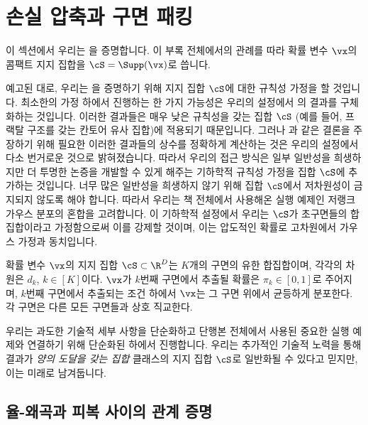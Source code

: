 \documentclass[../../book-main_ko.tex]{subfiles}
\begin{document}
\section{손실 압축과 구면 패킹}\label{app:rate-distortion-covering}

이 섹션에서 우리는 을 증명합니다.
이 부록 전체에서의 관례를 따라 확률 변수 \(\vx\)의 콤팩트 지지 집합을 \(\cS = \Supp(\vx)\)로 씁니다.

예고된 대로, 우리는 을 증명하기 위해 지지 집합 \(\cS\)에 대한 규칙성 가정을 할 것입니다. 최소한의 가정 하에서 진행하는 한 가지 가능성은 우리의 설정에서 \cite{Riegler2018-jh,Riegler2023-rr}의 결과를 구체화하는 것입니다. 이러한 결과들은 매우 낮은 규칙성을 갖는 집합 \(\cS\) (예를 들어, 프랙탈 구조를 갖는 칸토어 유사 집합)에 적용되기 때문입니다. 그러나 과 같은 결론을 주장하기 위해 필요한 이러한 결과들의 상수를 정확하게 계산하는 것은 우리의 설정에서 다소 번거로운 것으로 밝혀졌습니다.
따라서 우리의 접근 방식은 일부 일반성을 희생하지만 더 투명한 논증을 개발할 수 있게 해주는 기하학적 규칙성 가정을 집합 \(\cS\)에 추가하는 것입니다. 너무 많은 일반성을 희생하지 않기 위해 집합 \(\cS\)에서 저차원성이 금지되지 않도록 해야 합니다.
따라서 우리는 책 전체에서 사용해온 실행 예제인 저랭크 가우스 분포의 혼합을 고려합니다. 이 기하학적 설정에서 우리는 \(\cS\)가 초구면들의 합집합이라고 가정함으로써 이를 강제할 것이며, 이는 압도적인 확률로 고차원에서 가우스 가정과 동치입니다.

\begin{assumption}\label{assumption:union-of-spheres}
    확률 변수 \(\vx\)의 지지 집합 \(\cS \subset \R^D\)는 \(K\)개의 구면의 유한 합집합이며, 각각의 차원은 \(d_k\), \(k \in [K]\)이다.
    \(\vx\)가 \(k\)번째 구면에서 추출될 확률은 \(\pi_k \in [0, 1]\)로 주어지며, \(k\)번째 구면에서 추출되는 조건 하에서 \(\vx\)는 그 구면 위에서 균등하게 분포한다.
    각 구면은 다른 모든 구면들과 상호 직교한다.
\end{assumption}

우리는 과도한 기술적 세부 사항을 단순화하고 단행본 전체에서 사용된 중요한 실행 예제와 연결하기 위해 단순화된  하에서 진행합니다. 우리는 추가적인 기술적 노력을 통해 결과가 \textit{양의 도달을 갖는 집합} 클래스의 지지 집합 \(\cS\)로 일반화될 수 있다고 믿지만, 이는 미래로 남겨둡니다.




\subsection{율-왜곡과 피복 사이의 관계 증명}
\end{document}
